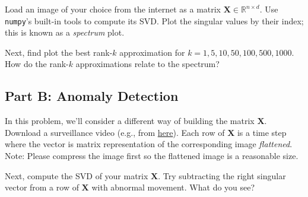 \documentclass{article}
\begin{document}
Load an image of your choice from the internet as a matrix \(\mathbf{X} \in \mathbb{R}^{n \times d}\). Use \texttt{numpy}'s built-in tools to compute its SVD. Plot the singular values by their index; this is known as a \emph{spectrum} plot.

Next, find plot the best rank-\(k\) approximation for \(k=1, 5, 10, 50, 100, 500, 1000\). How do the rank-\(k\) approximations relate to the spectrum?

\hypertarget{part-b-anomaly-detection}{%
\subsection*{Part B: Anomaly Detection}\label{part-b-anomaly-detection}}

In this problem, we'll consider a different way of building the matrix \(\mathbf{X}\). Download a surveillance video (e.g., from \href{https://raw.githubusercontent.com/AarohiSingla/Speed-detection-of-vehicles/main/highway.mp4}{here}). Each row of \(\mathbf{X}\) is a time step where the vector is matrix representation of the corresponding image \emph{flattened}. Note: Please compress the image first so the flattened image is a reasonable size.

Next, compute the SVD of your matrix \(\mathbf{X}\). Try subtracting the right singular vector from a row of \(\mathbf{X}\) with abnormal movement. What do you see?
\end{document}
